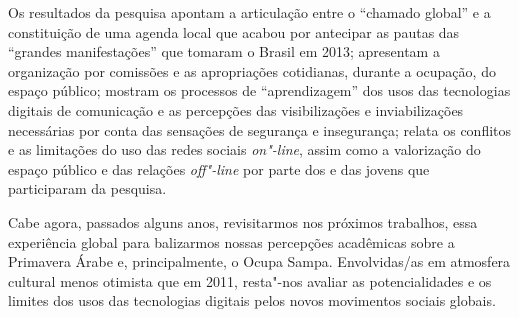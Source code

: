 Os resultados da pesquisa apontam a articulação entre o ``chamado
global'' e a constituição de uma agenda local que acabou por antecipar
as pautas das ``grandes manifestações'' que tomaram o Brasil em 2013;
apresentam a organização por comissões e as apropriações cotidianas,
durante a ocupação, do espaço público; mostram os processos de
``aprendizagem'' dos usos das tecnologias digitais de comunicação e as
percepções das visibilizações e inviabilizações necessárias por conta
das sensações de segurança e insegurança; relata os conflitos e as
limitações do uso das redes sociais \emph{on"-line}, assim como a
valorização do espaço público e das relações \emph{off"-line} por parte
dos e das jovens que participaram da pesquisa.

Cabe agora, passados alguns anos, revisitarmos nos próximos trabalhos,
essa experiência global para balizarmos nossas percepções acadêmicas
sobre a Primavera Árabe e, principalmente, o Ocupa Sampa. Envolvidas/as
em atmosfera cultural menos otimista que em 2011, resta"-nos avaliar as
potencialidades e os limites dos usos das tecnologias digitais pelos
novos movimentos sociais globais.


